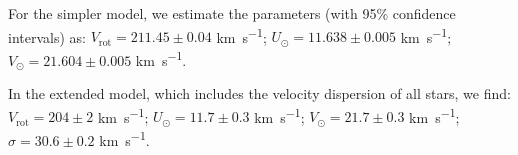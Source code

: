 For the simpler model, we estimate the parameters (with 95\% confidence intervals) as:  
$V_{\text{rot}} = 211.45 \pm 0.04$ \unit{\kilo\meter\per\second};  
$U_{\odot} = 11.638 \pm 0.005$ \unit{\kilo\meter\per\second};  
$V_{\odot} = 21.604 \pm 0.005$ \unit{\kilo\meter\per\second}.  

In the extended model, which includes the velocity dispersion of all stars, we find: 
$V_{\text{rot}} = 204 \pm 2$ \unit{\kilo\meter\per\second};  
$U_{\odot} = 11.7 \pm 0.3$ \unit{\kilo\meter\per\second};  
$V_{\odot} = 21.7 \pm 0.3$ \unit{\kilo\meter\per\second};  
$\sigma = 30.6 \pm 0.2$ \unit{\kilo\meter\per\second}.  

